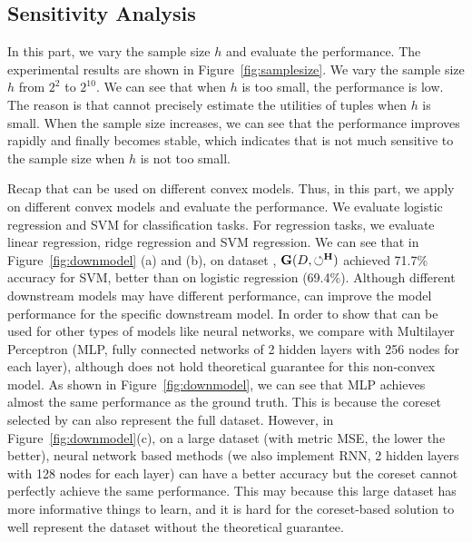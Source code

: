 \vspace{-0.5em}
\subsection{Sensitivity Analysis}
\label{exp:sec:sensitivity}

 In this part, we vary the sample size $h$ and evaluate the performance. The experimental results are shown in Figure~\ref{fig:samplesize}. We vary the sample size $h$ from $2^2$ to $2^{10}$. We can see that when $h$ is too small, the performance is low. The reason is that \ours cannot precisely estimate the utilities of tuples when $h$ is  small.  When the sample size increases, we can see that the performance improves rapidly and finally becomes stable, which indicates that \ours is not much sensitive to the sample size when $h$ is not too small.



 Recap that \ours can be used on different convex models. Thus, in this part, we apply \ours on different convex models and evaluate the performance. We evaluate logistic regression and SVM for classification tasks. For regression tasks, we evaluate linear regression, ridge regression and SVM regression. We can see that  in Figure~\ref{fig:downmodel} (a) and (b), on dataset \adult, $\mathbf{G}(D,\circlearrowleft^\mathbf{H})$ achieved 71.7\% accuracy for SVM, better than on logistic regression (69.4\%). Although different downstream models may have different performance, \ours can improve the model performance for the specific downstream model. In order to show that \ours can be used for other types of models like neural networks, we compare with Multilayer Perceptron (MLP, fully connected networks of 2 hidden layers with 256 nodes for each layer), although \ours does not hold
theoretical guarantee for this non-convex model. As shown in Figure~\ref{fig:downmodel}, we can see that MLP achieves almost the same performance as the ground truth. This is because the coreset selected by \ours can also represent the full dataset. However, in Figure~\ref{fig:downmodel}(c), on a large dataset \air (with metric MSE, the lower the better), neural network based methods (we also implement RNN, 2 hidden layers with 128 nodes for each layer) can have a better accuracy but the coreset cannot perfectly achieve the same performance. %
This may because this large dataset has more informative things to learn, and it is hard for the coreset-based solution to well represent the dataset without the theoretical guarantee.


